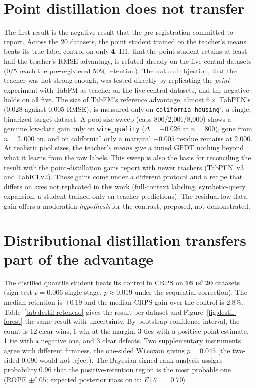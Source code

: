 \section{Point distillation does not transfer}
\label{sec:destil-ponto}

The first result is the negative result that the pre-registration committed to report. Across the 20 datasets, the point student
trained on the teacher's means beats its true-label control on only
\textbf{4}. H1, that the point student retains at least
half the teacher's RMSE advantage, is refuted already on the five
central datasets (0/5 reach the pre-registered 50\% retention). The
natural objection, that the teacher was not strong enough, was
tested directly by replicating the \emph{point} experiment with
TabFM as teacher on the five central datasets, and the negative
holds on all five. The size of TabFM's reference advantage, almost
$6\times$ TabPFN's (0.028 against 0.005 RMSE), is measured only on
\texttt{california\_\allowbreak housing}$^\dagger$, a single,
binarized-target dataset. A pool-size sweep (caps
800/2{,}000/8{,}000) shows a genuine low-data gain only on
\texttt{wine\_quality} ($\Delta=+0.026$ at $n{=}800$), gone
from $n{=}2{,}000$ on, and on california$^\dagger$ only a marginal
$+0.005$ residue remains at 2{,}000. At realistic pool sizes, the teacher's \emph{means} give a tuned GBDT nothing beyond what it learns from the raw labels. This sweep is also the basis for
reconciling the result with the point-distillation gains
\citet{jeong2026} report with newer teachers (TabPFN~v3 and
TabICLv2). Those gains come under a different protocol and
a recipe that differs on axes not replicated in this work
(full-context labeling, synthetic-query expansion, a student trained
only on teacher predictions). The residual low-data gain offers a
moderation \emph{hypothesis} for the contrast, proposed,
not demonstrated.

\section{Distributional distillation transfers part of the advantage}
\label{sec:destil-dist}

The distilled quantile student beats its control in CRPS on
\textbf{16 of 20} datasets (sign test $p=0.006$ single-stage,
$p\approx0.019$ under the sequential correction). The median
retention is $+0.19$ and the median CRPS gain over the control is
2.8\%. Table~\ref{tab:destil-retencao} gives the result per dataset
and Figure~\ref{fig:destil-forest} the same result with
uncertainty. By bootstrap confidence interval, the count is 12 clear
wins, 1 win at the margin, 3 ties with a positive point estimate, 1
tie with a negative one, and 3 clear defeats. Two supplementary
instruments agree with different firmness, the one-sided Wilcoxon
giving $p=0.045$ (the two-sided 0.090 would not reject). The
Bayesian signed-rank analysis assigns probability 0.96 that the
positive-retention region is the most probable one (ROPE
$\pm0.05$; expected posterior mass on it:
$E[\theta]=0.70$).

